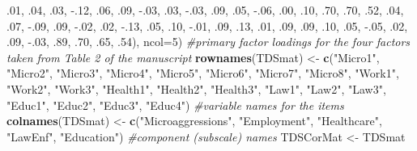 \documentclass[
  english,
]{book}
\newenvironment{Shaded}{\begin{snugshade}}{\end{snugshade}}
\newcommand{\CommentTok}[1]{\textcolor[rgb]{0.56,0.35,0.01}{\textit{#1}}}
\newcommand{\DataTypeTok}[1]{\textcolor[rgb]{0.13,0.29,0.53}{#1}}
\newcommand{\DecValTok}[1]{\textcolor[rgb]{0.00,0.00,0.81}{#1}}
\newcommand{\FloatTok}[1]{\textcolor[rgb]{0.00,0.00,0.81}{#1}}
\newcommand{\KeywordTok}[1]{\textcolor[rgb]{0.13,0.29,0.53}{\textbf{#1}}}
\newcommand{\NormalTok}[1]{#1}
\newcommand{\OperatorTok}[1]{\textcolor[rgb]{0.81,0.36,0.00}{\textbf{#1}}}
\newcommand{\StringTok}[1]{\textcolor[rgb]{0.31,0.60,0.02}{#1}}
\begin{document}
\begin{Shaded}
\begin{Highlighting}[]
                   \FloatTok{.01}\NormalTok{, }\FloatTok{.04}\NormalTok{, }\FloatTok{.03}\NormalTok{, }\FloatTok{-.12}\NormalTok{, }\FloatTok{.06}\NormalTok{, }\FloatTok{.09}\NormalTok{, }\FloatTok{-.03}\NormalTok{, }\FloatTok{.03}\NormalTok{, }\FloatTok{-.03}\NormalTok{, }\FloatTok{.09}\NormalTok{, }\FloatTok{.05}\NormalTok{, }\FloatTok{-.06}\NormalTok{, }\FloatTok{.00}\NormalTok{, }\FloatTok{.10}\NormalTok{, }\FloatTok{.70}\NormalTok{, }\FloatTok{.70}\NormalTok{, }\FloatTok{.52}\NormalTok{, }\FloatTok{.04}\NormalTok{, }\FloatTok{.07}\NormalTok{, }\FloatTok{-.09}\NormalTok{, }\FloatTok{.09}\NormalTok{,}
                   \FloatTok{-.02}\NormalTok{, }\FloatTok{.02}\NormalTok{, }\FloatTok{-.13}\NormalTok{, }\FloatTok{.05}\NormalTok{, }\FloatTok{.10}\NormalTok{, }\FloatTok{-.01}\NormalTok{, }\FloatTok{.09}\NormalTok{, }\FloatTok{.13}\NormalTok{, }\FloatTok{.01}\NormalTok{, }\FloatTok{.09}\NormalTok{, }\FloatTok{.09}\NormalTok{, }\FloatTok{.10}\NormalTok{, }\FloatTok{.05}\NormalTok{, }\FloatTok{-.05}\NormalTok{, }\FloatTok{.02}\NormalTok{, }\FloatTok{.09}\NormalTok{, }\FloatTok{-.03}\NormalTok{, }\FloatTok{.89}\NormalTok{, }\FloatTok{.70}\NormalTok{, }\FloatTok{.65}\NormalTok{, }\FloatTok{.54}\NormalTok{), }\DataTypeTok{ncol=}\DecValTok{5}\NormalTok{) }\CommentTok{#primary factor loadings for the four factors taken from Table 2 of the manuscript}
\KeywordTok{rownames}\NormalTok{(TDSmat) <-}\StringTok{ }\KeywordTok{c}\NormalTok{(}\StringTok{"Micro1"}\NormalTok{, }\StringTok{"Micro2"}\NormalTok{, }\StringTok{"Micro3"}\NormalTok{, }\StringTok{"Micro4"}\NormalTok{, }\StringTok{"Micro5"}\NormalTok{, }\StringTok{"Micro6"}\NormalTok{, }\StringTok{"Micro7"}\NormalTok{, }\StringTok{"Micro8"}\NormalTok{, }\StringTok{"Work1"}\NormalTok{, }\StringTok{"Work2"}\NormalTok{, }\StringTok{"Work3"}\NormalTok{, }\StringTok{"Health1"}\NormalTok{, }\StringTok{"Health2"}\NormalTok{, }\StringTok{"Health3"}\NormalTok{, }\StringTok{"Law1"}\NormalTok{, }\StringTok{"Law2"}\NormalTok{, }\StringTok{"Law3"}\NormalTok{, }\StringTok{"Educ1"}\NormalTok{, }\StringTok{"Educ2"}\NormalTok{,  }\StringTok{"Educ3"}\NormalTok{, }\StringTok{"Educ4"}\NormalTok{) }\CommentTok{#variable names for the items}
\KeywordTok{colnames}\NormalTok{(TDSmat) <-}\StringTok{ }\KeywordTok{c}\NormalTok{(}\StringTok{"Microaggressions"}\NormalTok{, }\StringTok{"Employment"}\NormalTok{, }\StringTok{"Healthcare"}\NormalTok{, }\StringTok{"LawEnf"}\NormalTok{, }\StringTok{"Education"}\NormalTok{) }\CommentTok{#component (subscale) names}
\NormalTok{TDSCorMat <-}\StringTok{ }\NormalTok{TDSmat }\OperatorTok{%
}
\end{Highlighting}
\end{Shaded}
\end{document}
